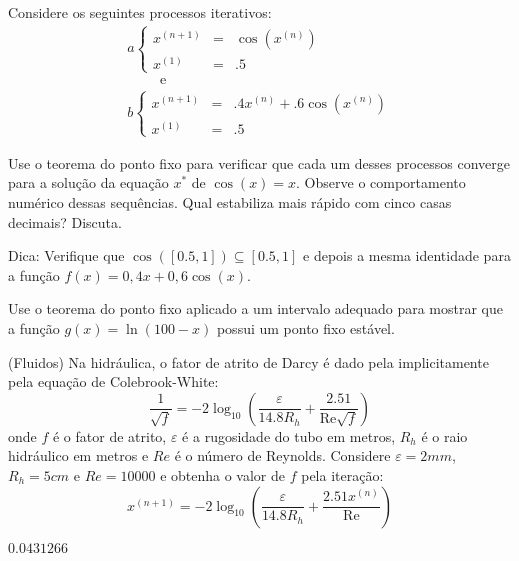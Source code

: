 \begin{exer} Considere os seguintes processos iterativos:
\begin{equation}
\begin{array}{l}
a\left\{\begin{array}{rcl}
x^{(n+1)}&=&\cos(x^{(n)})\\
x^{(1)}&=&.5
\end{array}
\right. \\ \qquad \text { e }\\
b\left\{\begin{array}{rcl}
x^{(n+1)}&=&.4x^{(n)}+.6\cos(x^{(n)})\\
x^{(1)}&=&.5
\end{array}
\right.
\end{array}
\end{equation}

Use o teorema do ponto fixo para verificar que cada um desses processos converge para a solução da equação $x^*$ de $\cos(x)=x$. Observe o comportamento numérico dessas sequências. Qual estabiliza mais rápido com cinco casas decimais? Discuta.

Dica: Verifique que $\cos([0.5,1])\subseteq [0.5,1]$ e depois a mesma identidade para a função $f(x)=0,4x+0,6\cos(x)$.
\end{exer}


\begin{exer}  Use o teorema do ponto fixo aplicado a um intervalo adequado para mostrar que a função $g(x)=\ln (100-x)$ possui um ponto fixo estável.
\end{exer}

\begin{exer}(Fluidos) Na hidráulica, o fator de atrito de Darcy é dado pela implicitamente pela equação de Colebrook-White:
\begin{equation} \frac{1}{\sqrt{f}}= -2 \log_{10} \left( \frac{\varepsilon}{14.8 R_h} + \frac{2.51}{\mathrm{Re}\sqrt{f}} \right) \end{equation}
onde $f$ é o fator de atrito, $\varepsilon$ é a rugosidade do tubo em metros, $R_{h}$ é o raio hidráulico em metros e ${Re}$ é o número de Reynolds. Considere $\varepsilon=2mm$, $R_{h}=5cm$ e ${Re}=10000$ e obtenha o valor de $f$ pela iteração:
\begin{equation} x^{(n+1)}=-2 \log_{10} \left( \frac{\varepsilon}{14.8 R_{h}} + \frac{2.51x^{(n)}}{\mathrm{Re}} \right) \end{equation}
\end{exer}
\begin{resp}

$0.0431266$

\end{resp}


